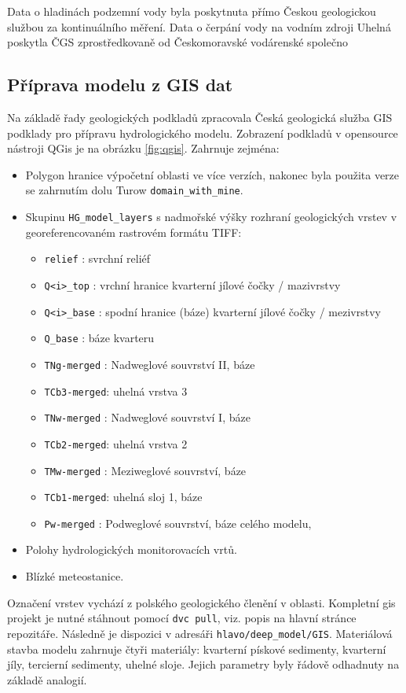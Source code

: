 \documentclass[11pt,a4paper]{article}
\begin{document}
\begin{onehalfspacing}
Data o hladinách podzemní vody byla poskytnuta přímo Českou geologickou službou za kontinuálního měření. Data o čerpání vody na vodním zdroji Uhelná poskytla ČGS zprostředkovaně od Českomoravské vodárenské společno


\subsection{Příprava modelu z GIS dat}
Na základě řady geologických podkladů zpracovala Česká geologická služba GIS podklady pro přípravu hydrologického modelu. Zobrazení podkladů v opensource nástroji QGis je na obrázku \ref{fig:qgis}. Zahrnuje zejména: 
\begin{itemize}
\item Polygon hranice výpočetní oblasti ve více verzích, nakonec byla použita verze se zahrnutím dolu Turow \verb`domain_with_mine`.

\item Skupinu \verb`HG_model_layers` s nadmořské výšky rozhraní geologických vrstev v georeferencovaném rastrovém formátu TIFF:
\begin{itemize}
    \item \verb'relief' : svrchní reliéf
    \item \verb'Q<i>_top' : vrchní hranice kvarterní jílové čočky / mazivrstvy
    \item \verb'Q<i>_base' : spodní hranice (báze) kvarterní jílové čočky / mezivrstvy
    \item  \verb'Q_base' : báze kvarteru
    \item \verb'TNg-merged' : Nadweglové souvrství II, báze
    \item \verb'TCb3-merged': uhelná vrstva 3
    \item \verb'TNw-merged' : Nadweglové souvrství I, báze
    \item \verb'TCb2-merged': uhelná vrstva 2
    \item \verb'TMw-merged' : Meziweglové souvrství, báze
    \item \verb'TCb1-merged': uhelná sloj 1, báze
    \item \verb'Pw-merged' : Podweglové souvrství, báze celého modelu, 
\end{itemize}
\item Polohy hydrologických monitorovacích vrtů.
\item Blízké meteostanice.
\end{itemize}
Označení vrstev vychází z polského geologického členění v oblasti.
Kompletní gis projekt je nutné stáhnout pomocí \verb'dvc pull', viz. popis na hlavní stránce repozitáře. Následně je dispozici v adresáři \verb'hlavo/deep_model/GIS'.
Materiálová stavba modelu zahrnuje čtyři materiály: kvarterní pískové sedimenty, kvarterní jíly, tercierní sedimenty, uhelné sloje. Jejich parametry byly řádově odhadnuty na základě analogií.


\end{onehalfspacing}
\end{document}

